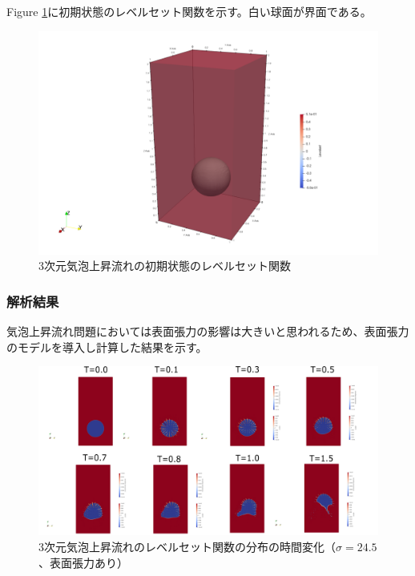 Figure \ref{fig:3d-bubble-levelset_t0_3d}に初期状態のレベルセット関数を示す。白い球面が界面である。

\begin{figure}[H]
	\centering
	\includegraphics[width=10truecm]{pics/3d-bubble/levelset_t0_3d.pdf}
	\caption{3次元気泡上昇流れの初期状態のレベルセット関数}
	\label{fig:3d-bubble-levelset_t0_3d}
\end{figure}

\subsubsection{解析結果}
気泡上昇流れ問題においては表面張力の影響は大きいと思われるため、表面張力のモデルを導入し計算した結果を示す。

\begin{figure}[H]
	\centering
	\includegraphics[width=18truecm]{pics/3d-bubble/result_sigma24_5.pdf}
	\caption{3次元気泡上昇流れのレベルセット関数の分布の時間変化（$\sigma=24.5$、表面張力あり）}
	\label{fig:3d-bubble_result_sigma24.5}
\end{figure}

